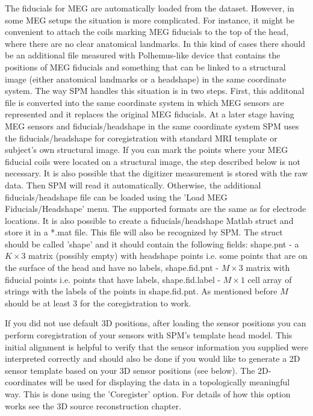 The fiducials for MEG are automatically loaded from the dataset. However, in some
MEG setups the situation is more complicated. For instance, it might be convenient 
to attach the coils marking MEG fiducials to the top of the head, where there are no
clear anatomical landmarks. In this kind of cases there should be an additional file measured with Polhemus-like
device that contains the positions of MEG fiducials and something that can be linked to a structural
image (either anatomical landmarks or a headshape) in the same coordinate system. The way SPM
handles this situation is in two steps. First, this additonal file is converted into the same
coordinate system in which MEG sensors are represented and it replaces the original MEG fiducials.
At a later stage having MEG sensors and fiducials/headshape in the same coordinate system SPM
uses the fiducials/headshape for coregistration with standard MRI template or subject's own structural image. 
If you can mark the points where your MEG fiducial coils were located on a structural image, the step
described below is not necessary. It is also possible that the digitizer measurement is stored with the
raw data. Then SPM will read it automatically. Otherwise, the additional fiducials/headshape file can be loaded
using the 'Load MEG Fiducials/Headshape' menu. The supported formats are the same as for electrode locations.
It is also possible to create a fiducials/headshape Matlab struct and store it in a *.mat file. This file will
also be recognized by SPM. The struct should be called 'shape' and it should contain the following fields:
shape.pnt - a $K \times 3$ matrix (possibly empty) with headshape points i.e. some points that are on the surface of the head
and have no labels, shape.fid.pnt - $M \times 3$ matrix with fiducial points i.e. points that have labels,
shape.fid.label - $M \times 1$ cell array of strings with the labels of the points in shape.fid.pnt. As mentioned
before $M$ should be at least 3 for the coregistration to work. 

If you did not use default 3D positions, after loading the sensor
positions you can perform coregistration of your sensors with SPM's
template head model. This initial alignment is helpful to verify that
the sensor information you supplied were interpreted correctly and
should also be done if you would like to generate a 2D sensor template
based on your 3D sensor positions (see below). The 2D-coordinates will
be used for displaying the data in a topologically meaningful way. This
is done using the 'Coregister' option. For details of how this option works
see the 3D source reconstruction chapter. 


